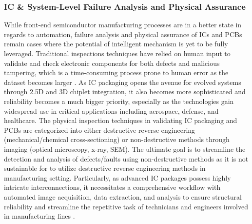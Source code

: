\subsubsection{IC \& System-Level Failure Analysis and Physical Assurance}
While front-end semiconductor manufacturing processes are in a better state in regards to automation, failure analysis and physical assurance of ICs and PCBs remain cases where the potential of intelligent mechanism is yet to be fully leveraged. Traditional inspections techniques have relied on human input to validate and check electronic components for both defects and malicious tampering, which is a time-consuming process prone to human error as the dataset becomes larger \cite{Zhao2022-ee}. As IC packaging opens the avenue for evolved systems through 2.5D and 3D chiplet integration, it also becomes more sophisticated and reliability becomes a much bigger priority, especially as the technologies gain widespread use in critical applications including aerospace, defense, and healthcare. The physical inspection techniques in validating IC packaging and PCBs are categorized into either destructive reverse engineering (mechanical/chemical cross-sectioning) or non-destructive methods through imaging (optical microscopy, x-ray, SEM). The ultimate goal is to streamline the detection and analysis of defects/faults using non-destructive methods as it is not sustainable for to utilize destructive reverse engineering methods in manufacturing setting. Particularly, as advanced IC packages possess highly intricate interconnections, it necessitates a comprehensive workflow with automated image acquisition, data extraction, and analysis to ensure structural reliability and streamline the repetitive task of technicians and engineers involved in manufacturing lines \cite{Yang2021-cp}.

